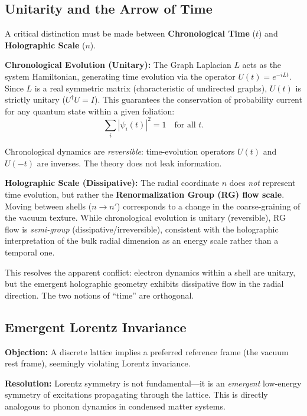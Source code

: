 \documentclass[aps,prd,twocolumn,superscriptaddress,groupedaddress,showpacs]{revtex4-2}
\begin{document}
\subsection{Unitarity and the Arrow of Time}

A critical distinction must be made between \textbf{Chronological Time} ($t$) and \textbf{Holographic Scale} ($n$).

\textbf{Chronological Evolution (Unitary):} The Graph Laplacian $L$ acts as the system Hamiltonian, generating time evolution via the operator $U(t) = e^{-iLt}$. Since $L$ is a real symmetric matrix (characteristic of undirected graphs), $U(t)$ is strictly unitary ($U^\dagger U = I$). This guarantees the conservation of probability current for any quantum state within a given foliation:
\begin{equation}
\sum_i |\psi_i(t)|^2 = 1 \quad \text{for all } t.
\end{equation}

Chronological dynamics are \emph{reversible}: time-evolution operators $U(t)$ and $U(-t)$ are inverses. The theory does not leak information.

\textbf{Holographic Scale (Dissipative):} The radial coordinate $n$ does \emph{not} represent time evolution, but rather the \textbf{Renormalization Group (RG) flow scale}. Moving between shells ($n \to n'$) corresponds to a change in the coarse-graining of the vacuum texture. While chronological evolution is unitary (reversible), RG flow is \emph{semi-group} (dissipative/irreversible), consistent with the holographic interpretation of the bulk radial dimension as an energy scale rather than a temporal one.

This resolves the apparent conflict: electron dynamics within a shell are unitary, but the emergent holographic geometry exhibits dissipative flow in the radial direction. The two notions of ``time'' are orthogonal.

\subsection{Emergent Lorentz Invariance}

\textbf{Objection:} A discrete lattice implies a preferred reference frame (the vacuum rest frame), seemingly violating Lorentz invariance.

\textbf{Resolution:} Lorentz symmetry is not fundamental---it is an \emph{emergent} low-energy symmetry of excitations propagating through the lattice. This is directly analogous to phonon dynamics in condensed matter systems.
\end{document}
